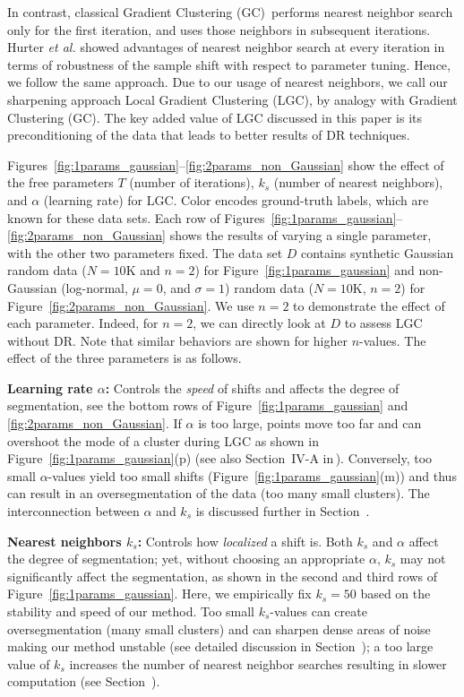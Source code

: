 \documentclass[sagev,Afour,times]{sagej}
\begin{document}
In contrast, classical Gradient Clustering (GC)\,\cite{gc1975} performs nearest neighbor search only for the first iteration, and uses those neighbors in subsequent iterations. Hurter \emph{et al.} showed advantages of nearest neighbor search at every iteration in terms of robustness of the sample shift with respect to parameter tuning. Hence, we follow the same approach.
Due to our usage of nearest neighbors, we call our sharpening approach Local Gradient Clustering (LGC), by analogy with Gradient Clustering (GC). The key added value of LGC discussed in this paper is its preconditioning of the data that leads to better results of DR techniques.

Figures~\ref{fig:1params_gaussian}--\ref{fig:2params_non_Gaussian} show the effect of the free parameters $T$ (number of iterations), $k_s$ (number of nearest neighbors), and $\alpha$ (learning rate) for LGC. Color encodes ground-truth labels, which are known for these data sets. Each row of Figures~\ref{fig:1params_gaussian}--\ref{fig:2params_non_Gaussian} shows the results of varying a single parameter, with the other two parameters fixed. The data set $D$ contains synthetic Gaussian random data ($N=10\mathrm{K}$ and $n=2$) for Figure~\ref{fig:1params_gaussian} and non-Gaussian (log-normal, $\mu=0$, and $\sigma=1$) random data ($N=10\mathrm{K}$, $n=2$) for Figure~\ref{fig:2params_non_Gaussian}. We use $n=2$ to demonstrate the effect of each parameter. Indeed, for $n=2$, we can directly look at $D$ to assess LGC without DR. Note that similar behaviors are shown for higher $n$-values. The effect of the three parameters is as follows.

\noindent\textbf{Learning rate $\alpha$:} Controls the \emph{speed} of shifts and affects the degree of segmentation, see the bottom rows of Figure~\ref{fig:1params_gaussian} and \ref{fig:2params_non_Gaussian}. If $\alpha$ is too large, points move too far and can overshoot the mode of a cluster during LGC as shown in Figure~\ref{fig:1params_gaussian}(p) (see also Section~IV-A in\,\cite{gc1975}). Conversely, too small $\alpha$-values yield too small shifts (Figure~\ref{fig:1params_gaussian}(m)) and thus can result in an oversegmentation of the data (too many small clusters). The interconnection between $\alpha$ and $k_s$ is discussed further in Section~.

\noindent\textbf{Nearest neighbors $k_s$:} Controls how \emph{localized} a shift is. Both $k_s$ and $\alpha$ affect the degree of segmentation; yet, without choosing an appropriate $\alpha$, $k_s$ may not significantly affect the segmentation, as shown in the second and third rows of Figure~\ref{fig:1params_gaussian}. Here, we empirically fix $k_s=50$ based on the stability and speed of our method. Too small $k_s$-values can create oversegmentation (many small clusters) and can sharpen dense areas of noise making our method unstable (see detailed discussion in Section~); a too large value of $k_s$ increases the number of nearest neighbor searches resulting in slower computation (see Section~).
\end{document}
